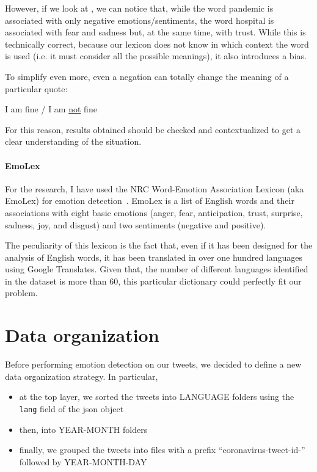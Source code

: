 However, if we look at , we can notice that, while the word pandemic is associated with only negative emotions/sentiments, the word hospital is associated with fear and sadness but, at the same time, with trust. While this is technically correct, because our lexicon does not know in which context the word is used (i.e. it must consider all the possible meanings), it also introduces a bias.

To simplify even more, even a negation can totally change the meaning of a particular quote:

\begin{center}
	I am fine / I am \underline{not} fine
\end{center}

For this reason, results obtained should be checked and contextualized to get a clear understanding of the situation. 

\paragraph{EmoLex}

For the research, I have used the NRC Word-Emotion Association Lexicon (aka EmoLex) for emotion detection~\cite{ncrwebsite}. EmoLex is a list of English words and their associations with eight basic emotions (anger, fear, anticipation, trust, surprise, sadness, joy, and disgust) and two sentiments (negative and positive).

The peculiarity of this lexicon is the fact that, even if it has been designed for the analysis of English words, it has been translated in over one hundred languages using Google Translates. Given that, the number of different languages identified in the dataset is more than 60, this particular dictionary could perfectly fit our problem.

\section{Data organization}
\label{sub:data-org}

Before performing emotion detection on our tweets, we decided to define a new data organization strategy. In particular,

\begin{itemize}
	\item at the top layer, we sorted the tweets into LANGUAGE folders using the \texttt{lang} field of the json object
	\item then, into YEAR-MONTH folders
	\item finally, we grouped the tweets into files with a prefix “coronavirus-tweet-id-” followed by YEAR-MONTH-DAY
\end{itemize}

